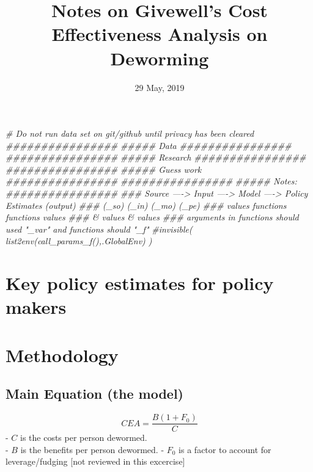 \documentclass[]{article}
\title{Notes on Givewell's Cost Effectiveness Analysis on Deworming}
\author{}
\date{29 May, 2019}
\newenvironment{Shaded}{\begin{snugshade}}{\end{snugshade}}
\newcommand{\CommentTok}[1]{\textcolor[rgb]{0.56,0.35,0.01}{\textit{#1}}}
\begin{document}
\maketitle

\def\blue{\color{blue}}

\begin{Shaded}
\begin{Highlighting}[]
\CommentTok{# Do not run data set on git/github until privacy has been cleared}
\CommentTok{################}
\CommentTok{##### Data  }
\CommentTok{################}
\CommentTok{################}
\CommentTok{##### Research}
\CommentTok{################}
\CommentTok{################}
\CommentTok{##### Guess work   }
\CommentTok{################}
\CommentTok{################}
\CommentTok{#####  Notes:}
\CommentTok{################}
\CommentTok{### Source ---->  Input ----> Model ----> Policy Estimates (output)}
\CommentTok{###  (_so)        (_in)       (_mo)        (_pe)}
\CommentTok{### values      functions   functions      values}
\CommentTok{###             & values    & values}
\CommentTok{### arguments in functions should used "_var" and functions should "_f"}
\CommentTok{#invisible( list2env(call_params_f(),.GlobalEnv) )}
\end{Highlighting}
\end{Shaded}

\hypertarget{key-policy-estimates-for-policy-makers}{%
\section{Key policy estimates for policy
makers}\label{key-policy-estimates-for-policy-makers}}

\hypertarget{methodology}{%
\section{Methodology}\label{methodology}}

\hypertarget{main-equation-the-model}{%
\subsection{Main Equation (the model)}\label{main-equation-the-model}}

\[
\begin{equation}
CEA = \frac{B (1 + F_{0})}{C}
\label{eq:1}
\tag{1}
\end{equation}
\] - \(C\) is the costs per person dewormed.\\
- \(B\) is the benefits per person dewormed. - \(F_{0}\) is a factor to
account for leverage/fudging {[}not reviewed in this excercise{]}
\end{document}
